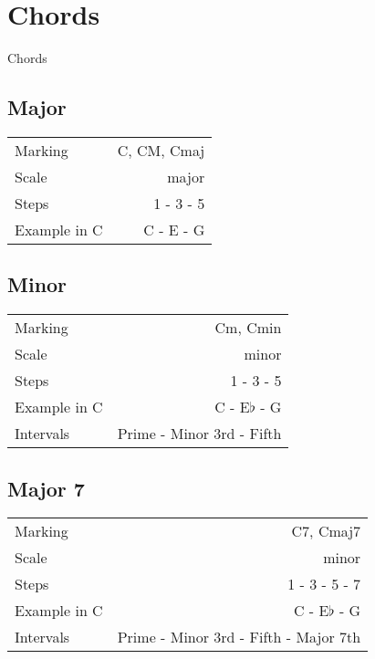 \section{Chords}
Chords

\subsection{Major}

\begin{tabular}{ l | r }
Marking      & C, CM, Cmaj \\
Scale        & major \\
Steps        & 1 - 3 - 5 \\
Example in C & C - E - G \\
\end{tabular}


\subsection{Minor}

\begin{tabular}{ l | r }
Marking      & Cm, Cmin \\
Scale        & minor \\
Steps        & 1 - 3 - 5 \\
Example in C & C - E$\flat$ - G \\
Intervals    & Prime - Minor 3rd - Fifth \\
\end{tabular}

\subsection{Major 7}
\begin{tabular}{ l | r }
    Marking      & C7, Cmaj7 \\
    Scale        & minor \\
    Steps        & 1 - 3 - 5 - 7 \\
    Example in C & C - E$\flat$ - G \\
    Intervals    & Prime - Minor 3rd - Fifth - Major 7th\\
\end{tabular}

